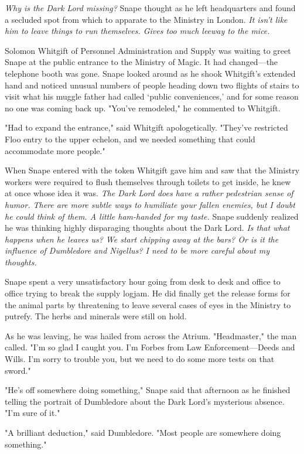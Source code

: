 \emph{Why is the Dark Lord missing?} Snape thought as he left headquarters and found a secluded spot from which to apparate to the Ministry in London. \emph{It isn't like him to leave things to run themselves. Gives too much leeway to the mice.}

Solomon Whitgift of Personnel Administration and Supply was waiting to greet Snape at the public entrance to the Ministry of Magic. It had changed—the telephone booth was gone. Snape looked around as he shook Whitgift's extended hand and noticed unusual numbers of people heading down two flights of stairs to visit what his muggle father had called `public conveniences,' and for some reason no one was coming back up. "You've remodeled," he commented to Whitgift.

"Had to expand the entrance," said Whitgift apologetically. "They've restricted Floo entry to the upper echelon, and we needed something that could accommodate more people."

When Snape entered with the token Whitgift gave him and saw that the Ministry workers were required to flush themselves through toilets to get inside, he knew at once whose idea it was. \emph{The Dark Lord does have a rather pedestrian sense of humor. There are more subtle ways to humiliate your fallen enemies, but I doubt he could think of them. A little ham-handed for my taste.} Snape suddenly realized he was thinking highly disparaging thoughts about the Dark Lord. \emph{Is that what happens when he leaves us? We start chipping away at the bars? Or is it the influence of Dumbledore and Nigellus? I need to be more careful about my thoughts.}

Snape spent a very unsatisfactory hour going from desk to desk and office to office trying to break the supply logjam. He did finally get the release forms for the animal parts by threatening to leave several cases of eyes in the Ministry to putrefy. The herbs and minerals were still on hold.

As he was leaving, he was hailed from across the Atrium. "Headmaster," the man called. "I'm so glad I caught you. I'm Forbes from Law Enforcement—Deeds and Wills. I'm sorry to trouble you, but we need to do some more tests on that sword."

\sbreak

"He's off somewhere doing something," Snape said that afternoon as he finished telling the portrait of Dumbledore about the Dark Lord's mysterious absence. "I'm sure of it."

"A brilliant deduction," said Dumbledore. "Most people are somewhere doing something."

